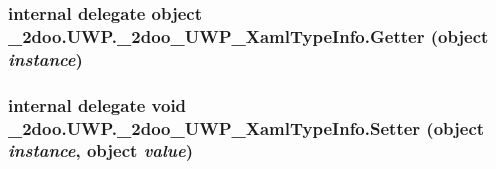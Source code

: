 \hypertarget{namespace__2doo_1_1_u_w_p_1_1__2doo___u_w_p___xaml_type_info_83c5abd38b6122306bad19bb722b0359}{
\subsubsection[{Getter}]{\setlength{\rightskip}{0pt plus 5cm}internal delegate object \_\-2doo.UWP.\_\-2doo\_\-UWP\_\-XamlTypeInfo.Getter (object {\em instance})}}
\label{namespace__2doo_1_1_u_w_p_1_1__2doo___u_w_p___xaml_type_info_83c5abd38b6122306bad19bb722b0359}


\hypertarget{namespace__2doo_1_1_u_w_p_1_1__2doo___u_w_p___xaml_type_info_3bc82ad258ccc8c7a99ee83f313f023a}{
\subsubsection[{Setter}]{\setlength{\rightskip}{0pt plus 5cm}internal delegate void \_\-2doo.UWP.\_\-2doo\_\-UWP\_\-XamlTypeInfo.Setter (object {\em instance}, \/  object {\em value})}}
\label{namespace__2doo_1_1_u_w_p_1_1__2doo___u_w_p___xaml_type_info_3bc82ad258ccc8c7a99ee83f313f023a}


